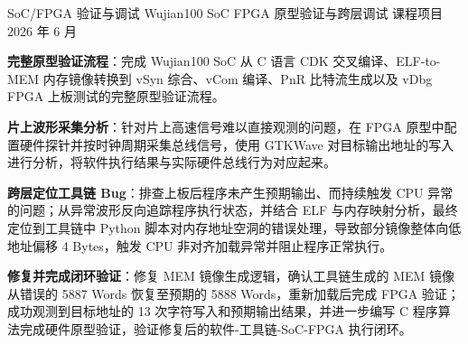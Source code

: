 \Needspace{4cm}


\begin{cventries}

  \cventry
  {SoC/FPGA 验证与调试} %
  {Wujian100 SoC FPGA 原型验证与跨层调试} %
  {课程项目} %
  {2026 年 6 月} %
  {
    \begin{cvitems} %
      \item {\textbf{完整原型验证流程}：完成 Wujian100 SoC 从 C 语言 CDK 交叉编译、ELF-to-MEM 内存镜像转换到 vSyn 综合、vCom 编译、PnR 比特流生成以及 vDbg FPGA 上板测试的完整原型验证流程。}
      \item {\textbf{片上波形采集分析}：针对片上高速信号难以直接观测的问题，在 FPGA 原型中配置硬件探针并按时钟周期采集总线信号，使用 GTKWave 对目标输出地址的写入进行分析，将软件执行结果与实际硬件总线行为对应起来。}
      \item {\textbf{跨层定位工具链 Bug}：排查上板后程序未产生预期输出、而持续触发 CPU 异常的问题；从异常波形反向追踪程序执行状态，并结合 ELF 与内存映射分析，最终定位到工具链中 Python 脚本对内存地址空洞的错误处理，导致部分镜像整体向低地址偏移 4 Bytes，触发 CPU 非对齐加载异常并阻止程序正常执行。}
      \item {\textbf{修复并完成闭环验证}：修复 MEM 镜像生成逻辑，确认工具链生成的 MEM 镜像从错误的 5887 Words 恢复至预期的 5888 Words，重新加载后完成 FPGA 验证；成功观测到目标地址的 13 次字符写入和预期输出结果，并进一步编写 C 程序算法完成硬件原型验证，验证修复后的软件-工具链-SoC-FPGA 执行闭环。}
    \end{cvitems}
  }


\end{cventries}
